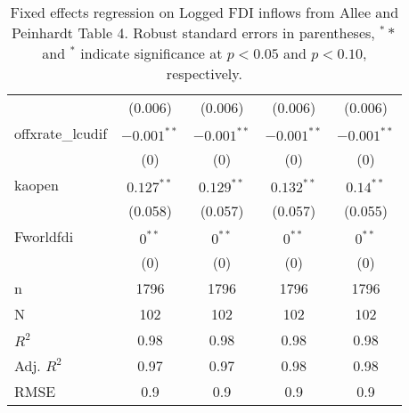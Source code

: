 \documentclass[]{article}
\begin{document}
\begin{table}[ht]
\begin{tabular}{lcccc}
   & (0.006) & (0.006) & (0.006) & (0.006) \\ 
  offxrate\_lcudif & $-0.001^{\ast\ast}$ & $-0.001^{\ast\ast}$ & $-0.001^{\ast\ast}$ & $-0.001^{\ast\ast}$ \\ 
   & (0) & (0) & (0) & (0) \\ 
  kaopen & $0.127^{\ast\ast}$ & $0.129^{\ast\ast}$ & $0.132^{\ast\ast}$ & $0.14^{\ast\ast}$ \\ 
   & (0.058) & (0.057) & (0.057) & (0.055) \\ 
  Fworldfdi & $0^{\ast\ast}$ & $0^{\ast\ast}$ & $0^{\ast\ast}$ & $0^{\ast\ast}$ \\ 
   & (0) & (0) & (0) & (0) \\ 
   \hline
\hline
n & 1796 & 1796 & 1796 & 1796 \\ 
  N & 102 & 102 & 102 & 102 \\ 
  $R^{2}$ & 0.98 & 0.98 & 0.98 & 0.98 \\ 
  Adj. $R^{2}$ & 0.97 & 0.97 & 0.98 & 0.98 \\ 
  RMSE & 0.9 & 0.9 & 0.9 & 0.9 \\ 
  \end{tabular}
\caption{Fixed effects regression on Logged FDI inflows from Allee and Peinhardt Table 4. Robust standard errors in parentheses, $^**$ and $^*$ indicate significance at $p< 0.05 $ and $p< 0.10 $, respectively.} 
\end{table}
\end{document}
